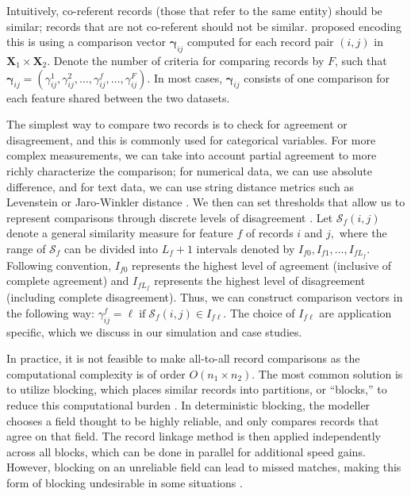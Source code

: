 \documentclass[ba]{imsart}
\begin{document}

Intuitively, co-referent records (those that refer to the same entity) should be similar; records that are not co-referent should not be similar. \cite{fellegi_theory_1969} proposed encoding this is using a comparison vector $\bm{\gamma}_{ij}$ computed for each record pair $(i,j)$ in $\bm{X}_1 \times \bm{X}_2.$ Denote the number of criteria for comparing records by $F$, such that $\bm{\gamma}_{ij} = (\gamma_{ij}^1, \gamma_{ij}^2, \ldots, \gamma_{ij}^f, \ldots, \gamma_{ij}^F).$ In most cases, $\bm{\gamma}_{ij}$ consists of one comparison for each feature shared between the two datasets. 

The simplest way to compare two records is to check for agreement or disagreement, and this is commonly used for categorical variables. For more complex measurements, we can take into account partial agreement to more richly characterize the comparison; for numerical data, we can use absolute difference, and for text data, we can use string distance metrics such as Levenstein or Jaro-Winkler distance \citep{cohen2003comparison}. We then can set thresholds that allow us to represent comparisons through discrete levels of disagreement \citep{bilenko2006riddle, elmagarmid_duplicate_2007}. Let $\mathcal{S}_f(i,j)$ denote a general similarity measure for feature $f$ of records $i$ and $j,$ where the range of $\mathcal{S}_f$ can be divided into $L_f +1$ intervals denoted by $I_{f0}, I_{f1}, \ldots, I_{fL_f}$. Following convention, $I_{f0}$ represents the highest level of agreement (inclusive of complete agreement) and $I_{fL_f}$ represents the highest level of disagreement (including complete disagreement). Thus, we can construct comparison vectors in the following way: 
$\gamma_{ij}^f = \ell \; \text{if} \; \mathcal{S}_f(i,j) \in I_{f\ell}.$
The choice of $I_{f\ell}$ are application specific, which we discuss in our simulation and case studies. 

In practice, it is not feasible to make all-to-all record comparisons as the computational complexity is of order $O(n_1 \times n_2).$ The most common solution is to utilize blocking, which places similar records into partitions, or ``blocks,'' to reduce this computational burden \citep{steorts_comparison_2014, murray2016probabilistic}. In deterministic blocking, the modeller chooses a field thought to be highly reliable, and only compares records that agree on that field. The record linkage method is then applied independently across all blocks, which can be done in parallel for additional speed gains. However, blocking on an unreliable field can lead to missed matches, making this form of blocking undesirable in some situations \citep{steorts_comparison_2014}.
\end{document}

